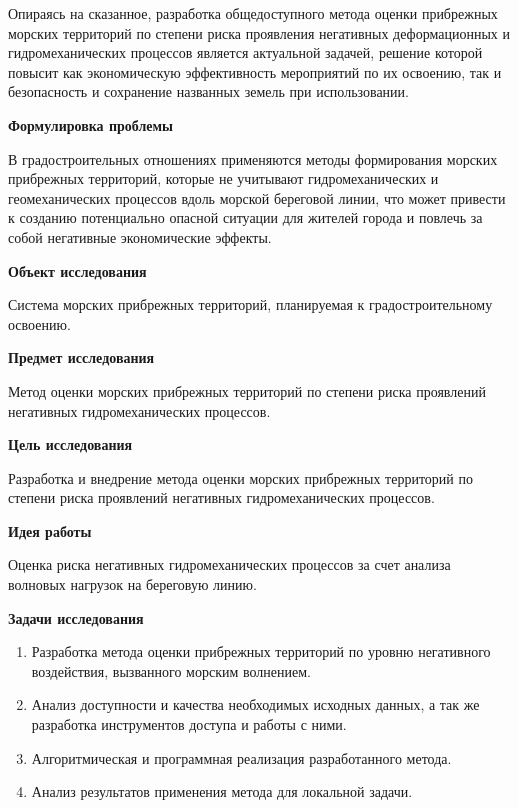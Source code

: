 Опираясь на сказанное, разработка общедоступного метода оценки прибрежных морских территорий по степени риска проявления негативных деформационных и гидромеханических процессов является актуальной задачей, решение которой повысит как экономическую эффективность мероприятий по их освоению, так и безопасность и сохранение названных земель при использовании.

\vspace{1em}
\textbf{Формулировка проблемы}

В градостроительных отношениях применяются методы формирования морских прибрежных территорий, которые не учитывают гидромеханических и геомеханических процессов вдоль морской береговой линии, что может привести к созданию потенциально опасной ситуации для жителей города и повлечь за собой негативные экономические эффекты.

\vspace{1em}
\textbf{Объект исследования}

Система морских прибрежных территорий, планируемая к градостроительному освоению.

\vspace{1em}
\textbf{Предмет исследования}

Метод оценки морских прибрежных территорий по степени риска проявлений негативных гидромеханических процессов.

\vspace{1em}
\textbf{Цель исследования}

Разработка и внедрение метода оценки морских прибрежных территорий по степени риска проявлений негативных гидромеханических процессов.

\vspace{1em}
\textbf{Идея работы}

Оценка риска негативных гидромеханических процессов за счет анализа волновых нагрузок на береговую линию.

\vspace{1em}
\textbf{Задачи исследования}

\begin{enumerate}

    \item Разработка метода оценки прибрежных территорий по уровню негативного воздействия, вызванного морским волнением.
    \item Анализ доступности и качества необходимых исходных данных, а так же разработка инструментов доступа и работы с ними.
    \item Алгоритмическая и программная реализация разработанного метода.
    \item Анализ результатов применения метода для локальной задачи.

\end{enumerate}

